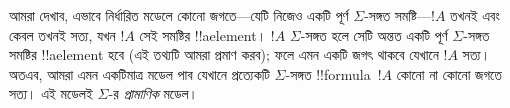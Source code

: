 \documentclass[../../../include/open-logic-section]{subfiles}
\begin{document}
আমরা দেখাব, এভাবে নির্ধারিত মডেলে কোনো জগতে—যেটি নিজেও একটি পূর্ণ $\Sigma$-সঙ্গত সমষ্টি—$!A$ তখনই এবং কেবল তখনই সত্য, যখন $!A$ সেই সমষ্টির !!a{element}। $!A$ $\Sigma$-সঙ্গত হলে সেটি অন্তত একটি পূর্ণ $\Sigma$-সঙ্গত সমষ্টির !!a{element} হবে (এই তথ্যটি আমরা প্রমাণ করব); ফলে এমন একটি জগৎ থাকবে যেখানে $!A$ সত্য। অতএব, আমরা এমন একটিমাত্র মডেল পাব যেখানে প্রত্যেকটি $\Sigma$-সঙ্গত !!{formula}~$!A$ কোনো না কোনো জগতে সত্য। এই মডেলই $\Sigma$-র \emph{প্রামাণিক} মডেল।
\end{document}
